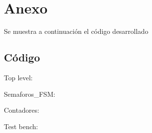\documentclass[titlepage,a4paper]{article}
\begin{document}
\newpage

\section{Anexo}\label{sec:anexo}
Se muestra a continuación el código desarrollado

\subsection{Código}

Top level:



Semaforos\_FSM:



Contadores:



Test bench:

\end{document}
